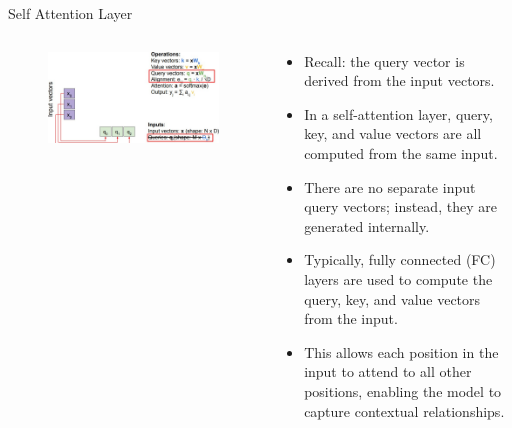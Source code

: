 \begin{frame}[allowframebreaks]{Self Attention Layer}
    \begin{columns}
    \begin{column}{0.6\textwidth}
        \begin{figure}
            \flushleft
            \includegraphics[width=\linewidth,height=\textheight,keepaspectratio]{images/transformers/slide_41_1_img.jpg}
        \end{figure}
    \end{column}
    \begin{column}{0.5\textwidth}
        \begin{itemize}
            \item Recall: the query vector is derived from the input vectors.
            \item In a self-attention layer, query, key, and value vectors are all computed from the same input.
            \item There are no separate input query vectors; instead, they are generated internally.
            \item Typically, fully connected (FC) layers are used to compute the query, key, and value vectors from the input.
            \item This allows each position in the input to attend to all other positions, enabling the model to capture contextual relationships.
        \end{itemize}
    \end{column}
    \end{columns}

    \framebreak


\end{frame}
